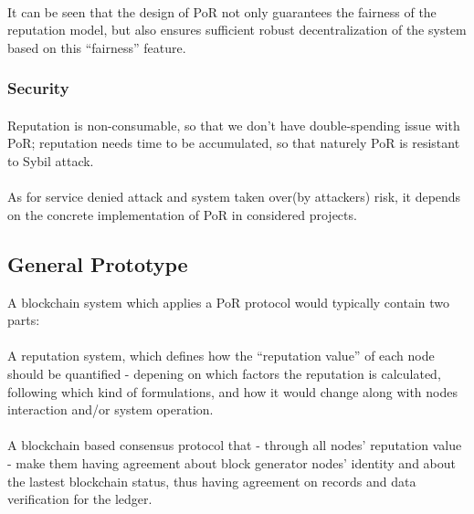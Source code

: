 \documentclass[doublespacing]{bmcart}
\begin{document}
\begin{CJK*}{UTF8}{gbsn}
\paragraph{} It can be seen that the design of PoR not only guarantees the fairness of the reputation model, but also ensures sufficient robust decentralization of the system based on this ``fairness'' feature.
\subsubsection*{Security}
\paragraph{} Reputation is non-consumable, so that we don't have double-spending issue with PoR; reputation needs time to be accumulated, so that naturely PoR is resistant to Sybil attack.
\paragraph{} As for service denied attack and system taken over(by attackers) risk, it depends on the concrete implementation of PoR in considered projects. 

\subsection{General Prototype}
A blockchain system which applies a PoR protocol would typically contain two parts:
\paragraph{}
  A reputation system, which defines how the ``reputation value'' of each node should be quantified - depening on which factors the reputation is calculated, following which kind of formulations, and how it would change along with nodes interaction and/or system operation.
\paragraph{}
 A blockchain based consensus protocol that - through all nodes' reputation value - make them having agreement about block generator nodes' identity and about the lastest blockchain status, thus having agreement on records and data verification for the ledger.  

\end{CJK*}
\end{document}
